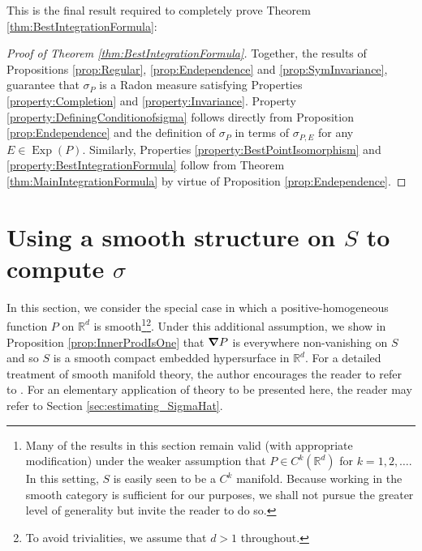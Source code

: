 \documentclass[11pt, letter]{book}
\newcommand\Exp{\operatorname{Exp}}
\begin{document}
\noindent This is the final result required to completely prove Theorem \ref{thm:BestIntegrationFormula}:



\begin{proof}[Proof of Theorem \ref{thm:BestIntegrationFormula}]
Together, the results of Propositions \ref{prop:Regular}, \ref{prop:Endependence} and \ref{prop:SymInvariance}, guarantee that $\sigma_P$ is a Radon measure satisfying Properties \ref{property:Completion} and \ref{property:Invariance}. Property \ref{property:DefiningConditionofsigma} follows directly from Proposition \ref{prop:Endependence} and the definition of $\sigma_P$ in terms of $\sigma_{P,E}$ for any $E\in\Exp(P)$. Similarly, Properties \ref{property:BestPointIsomorphism} and \ref{property:BestIntegrationFormula} follow from Theorem \ref{thm:MainIntegrationFormula} by virtue of Proposition \ref{prop:Endependence}. 
\end{proof}









\section{Using a smooth structure on $S$ to compute $\sigma$}\label{sec:smooth_manifold}


\noindent In this section, we consider the special case in which a positive-homogeneous function $P$ on $\mathbb{R}^d$ is smooth\footnote{Many of the results in this section remain valid (with appropriate modification) under the weaker assumption that $P\in C^k(\mathbb{R}^d)$ for $k=1,2,\dots$. In this setting, $S$ is easily seen to be a $C^k$ manifold. Because working in the smooth category is sufficient for our purposes, we shall not pursue the greater level of generality but invite the reader to do so.}\footnote{{To avoid trivialities, we assume that $d>1$ throughout.}}.
Under this additional assumption, we show in Proposition \ref{prop:InnerProdIsOne} that $\grad P$ is everywhere non-vanishing on $S$ and so $S$ is a smooth compact embedded hypersurface in $\mathbb{R}^d$. For a detailed treatment of smooth manifold theory, the author encourages the reader to refer to \cite{lee_introduction_2003}. For an elementary application of theory to be presented here, the reader may refer to Section \ref{sec:estimating_SigmaHat}.\\
\end{document}
